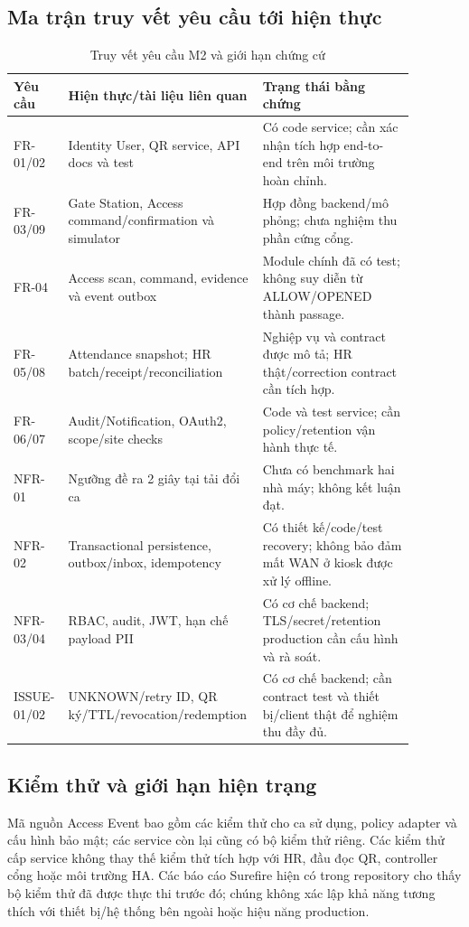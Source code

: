 \subsection{Ma trận truy vết yêu cầu tới hiện thực}
\label{subsec:traceability}
\begin{table}[htbp]
\centering
\caption{Truy vết yêu cầu M2 và giới hạn chứng cứ}\label{tab:traceability}
\begin{tabular}{|>{\raggedright\arraybackslash}p{0.13\linewidth}|>{\raggedright\arraybackslash}p{0.38\linewidth}|>{\raggedright\arraybackslash}p{0.37\linewidth}|}\hline
\textbf{Yêu cầu} & \textbf{Hiện thực/tài liệu liên quan} & \textbf{Trạng thái bằng chứng} \\\hline
FR-01/02 & Identity User, QR service, API docs và test & Có code service; cần xác nhận tích hợp end-to-end trên môi trường hoàn chỉnh. \\\hline
FR-03/09 & Gate Station, Access command/confirmation và simulator & Hợp đồng backend/mô phỏng; chưa nghiệm thu phần cứng cổng. \\\hline
FR-04 & Access scan, command, evidence và event outbox & Module chính đã có test; không suy diễn từ ALLOW/OPENED thành passage. \\\hline
FR-05/08 & Attendance snapshot; HR batch/receipt/reconciliation & Nghiệp vụ và contract được mô tả; HR thật/correction contract cần tích hợp. \\\hline
FR-06/07 & Audit/Notification, OAuth2, scope/site checks & Code và test service; cần policy/retention vận hành thực tế. \\\hline
NFR-01 & Ngưỡng đề ra 2 giây tại tải đổi ca & Chưa có benchmark hai nhà máy; không kết luận đạt. \\\hline
NFR-02 & Transactional persistence, outbox/inbox, idempotency & Có thiết kế/code/test recovery; không bảo đảm mất WAN ở kiosk được xử lý offline. \\\hline
NFR-03/04 & RBAC, audit, JWT, hạn chế payload PII & Có cơ chế backend; TLS/secret/retention production cần cấu hình và rà soát. \\\hline
ISSUE-01/02 & UNKNOWN/retry ID, QR ký/TTL/revocation/redemption & Có cơ chế backend; cần contract test và thiết bị/client thật để nghiệm thu đầy đủ. \\\hline
\end{tabular}
\end{table}

\subsection{Kiểm thử và giới hạn hiện trạng}
\label{subsec:testing-limits}
Mã nguồn Access Event bao gồm các kiểm thử cho ca sử dụng, policy adapter và cấu hình bảo mật; các service còn lại cũng có bộ kiểm thử riêng. Các kiểm thử cấp service không thay thế kiểm thử tích hợp với HR, đầu đọc QR, controller cổng hoặc môi trường HA. Các báo cáo Surefire hiện có trong repository cho thấy bộ kiểm thử đã được thực thi trước đó; chúng không xác lập khả năng tương thích với thiết bị/hệ thống bên ngoài hoặc hiệu năng production.

